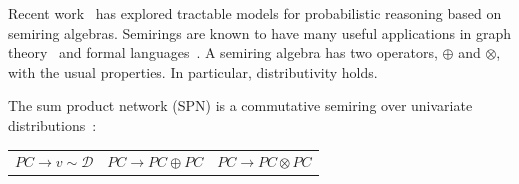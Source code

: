 \documentclass[11pt]{article}
\begin{document}
    Recent work~\cite{choi2020probabilistic} has explored tractable models for probabilistic reasoning based on semiring algebras. Semirings are known to have many useful applications in graph theory~\cite{dolan2013fun} and formal languages~\cite{bernady2013efficient}. A semiring algebra has two operators, $\oplus$ and $\otimes$, with the usual properties. In particular, distributivity holds.

    The sum product network (SPN) is a commutative semiring over univariate distributions~\cite{friesen2016sum}:
    \begin{center}
        \begin{tabular}{ccc}
            $PC \rightarrow v \sim \mathcal{D}$ &
            $PC \rightarrow PC \oplus PC$ &
            $PC \rightarrow PC \otimes PC$
        \end{tabular}
    \end{center}

%
\end{document}
